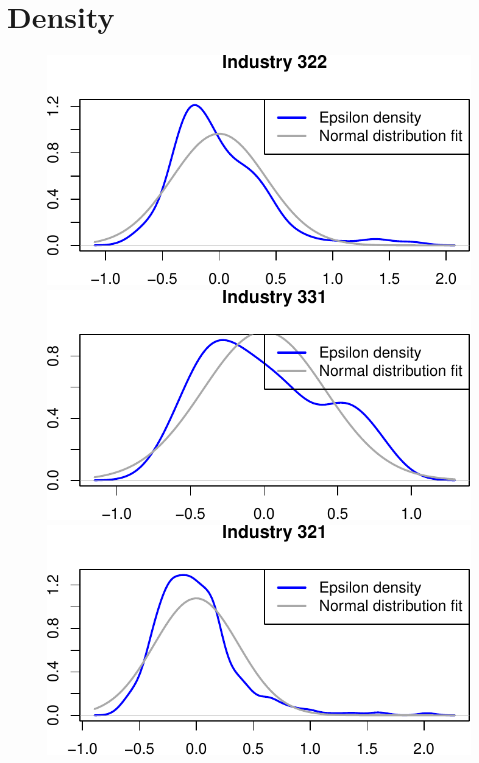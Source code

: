 \documentclass[
  12pt]{article}
\theoremstyle{definition}
\theoremstyle{remark}
\begin{document}
\section{Density}\label{density}

\begin{figure}

\begin{minipage}{\linewidth}

\includegraphics{Tax-Prod_files/figure-pdf/unnamed-chunk-59-1.pdf}

\includegraphics{Tax-Prod_files/figure-pdf/unnamed-chunk-59-2.pdf}

\includegraphics{Tax-Prod_files/figure-pdf/unnamed-chunk-59-3.pdf}


\end{minipage}
\end{figure}
\end{document}
